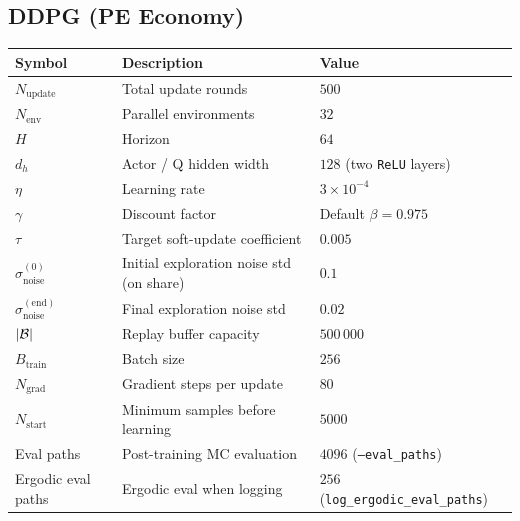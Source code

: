 \subsection{DDPG (PE Economy)}
\label{appendix_hyper_ddpg_pe}
\begin{table}[H]
  \centering
  \small
  \setlength{\tabcolsep}{6pt}
  \renewcommand{\arraystretch}{1.15}
  \begin{tabular}{@{}p{2.4cm}p{6.2cm}p{4.8cm}@{}}
    \toprule
    Symbol & Description & Value \\
    \midrule
    $N_{\mathrm{update}}$ & Total update rounds & $500$ \\
    $N_{\mathrm{env}}$ & Parallel environments & $32$ \\
    $H$ & Horizon & $64$ \\
    $d_h$ & Actor / Q hidden width & $128$ (two \texttt{ReLU} layers) \\
    $\eta$ & Learning rate & $3\times 10^{-4}$ \\
    $\gamma$ & Discount factor & Default $\beta=0.975$ \\
    $\tau$ & Target soft-update coefficient & $0.005$ \\
    $\sigma_{\mathrm{noise}}^{(0)}$ & Initial exploration noise std (on share) & $0.1$ \\
    $\sigma_{\mathrm{noise}}^{(\mathrm{end})}$ & Final exploration noise std & $0.02$ \\
    $|{\cal B}|$ & Replay buffer capacity & $500\,000$ \\
    $B_{\mathrm{train}}$ & Batch size & $256$ \\
    $N_{\mathrm{grad}}$ & Gradient steps per update & $80$ \\
    $N_{\mathrm{start}}$ & Minimum samples before learning & $5000$ \\
    Eval paths & Post-training MC evaluation & $4096$ (\texttt{--eval\_paths}) \\
    Ergodic eval paths & Ergodic eval when logging & $256$ (\texttt{log\_ergodic\_eval\_paths}) \\
    \bottomrule
  \end{tabular}
\end{table}
